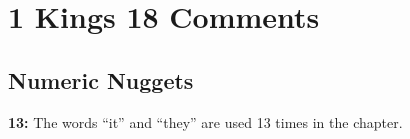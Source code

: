 \section{1 Kings 18 Comments}

\subsection{Numeric Nuggets}
\textbf{13: } The words ``it'' and ``they'' are used 13 times in the chapter.


